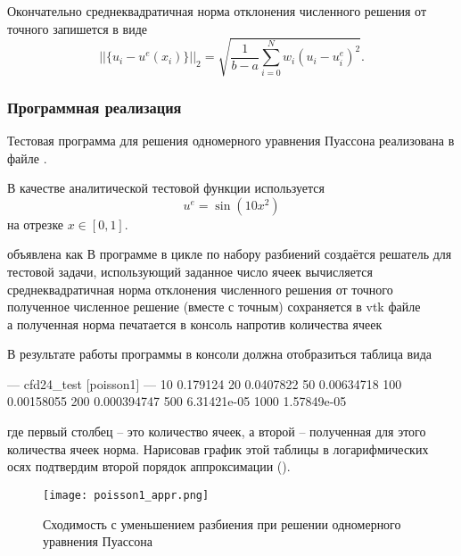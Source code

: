 Окончательно среднеквадратичная норма отклонения численного решения от точного запишется в виде
\begin{equation}
    \label{eq:poisson1d_fdm_norm}
    ||\{u_i - u^e(x_i)\}||_2 = \sqrt{\frac{1}{b-a}\sum_{i=0}^{N} w_i \left(u_i - u^e_i\right)^2}.
\end{equation}

\subsubsection{Программная реализация}


Тестовая программа для решения одномерного уравнения Пуассона 
реализована в файле .

В качестве аналитической тестовой функции  используется
\begin{equation*}
    u^e = \sin(10 x^2)
\end{equation*}
на отрезке $x\in[0,1]$.

объявлена как
В программе в цикле по набору разбиений 
создаётся решатель для тестовой задачи, использующий заданное число ячеек
вычисляется среднеквадратичная норма отклонения численного решения от точного
полученное численное решение (вместе с точным) сохраняется в vtk файле\\
а полученная норма печатается в консоль напротив количества ячеек

В результате работы программы в консоли должна отобразиться таблица вида
\begin{shelloutput}
--- cfd24_test [poisson1] ---
10 0.179124
20 0.0407822
50 0.00634718
100 0.00158055
200 0.000394747
500 6.31421e-05
1000 1.57849e-05
\end{shelloutput}
где первый столбец -- это количество ячеек, а второй -- полученная для этого количества ячеек норма.
Нарисовав график этой таблицы в логарифмических осях подтвердим второй порядок аппроксимации ().

\begin{figure}[h]
\centering
\texttt{[image: poisson1\_appr.png]}
\caption{Сходимость с уменьшением разбиения при решении одномерного уравнения Пуассона}
\label{fig:poisson_convergence}
\end{figure}

